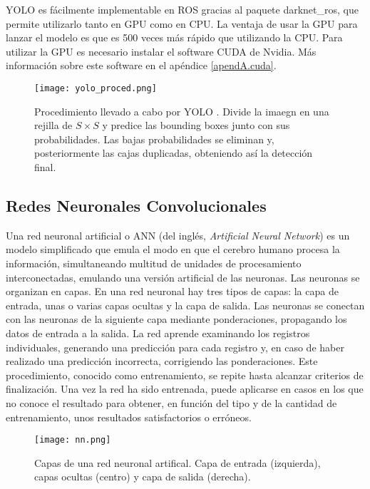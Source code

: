 YOLO es fácilmente implementable en ROS gracias al paquete darknet\_ros, que permite utilizarlo tanto en GPU como en CPU. La ventaja de usar la GPU para lanzar el modelo es que es 500 veces más rápido que utilizando la CPU. Para utilizar la GPU es necesario instalar el software CUDA de Nvidia. Más información sobre este software en el apéndice \ref{apendA.cuda}.\\

\begin{figure}[H]
	\begin{center} 
		\texttt{[image: yolo\_proced.png]}
	\end{center}
	\caption{Procedimiento llevado a cabo por YOLO \cite{yolo}. Divide la imaegn en una rejilla de $S \times S$ y predice las bounding boxes junto con sus probabilidades. Las bajas probabilidades se eliminan y, posteriormente las cajas duplicadas, obteniendo así la detección final.}
	\label{fig:proced}
\end{figure}


\subsection{Redes Neuronales Convolucionales}

Una red neuronal artificial o ANN (del inglés, \textit{Artificial Neural Network}) es un modelo simplificado que emula el modo en que el cerebro humano procesa la información, simultaneando multitud de unidades de procesamiento interconectadas, emulando una versión artificial de las neuronas. Las neuronas se organizan en capas. En una red neuronal hay tres tipos de capas: la capa de entrada, unas o varias capas ocultas y la capa de salida. Las neuronas se conectan con las neuronas de la siguiente capa mediante ponderaciones, propagando los datos de entrada a la salida. La red aprende examinando los registros individuales, generando una predicción para cada registro y, en caso de haber realizado una predicción incorrecta, corrigiendo las ponderaciones. Este procedimiento, conocido como entrenamiento, se repite hasta alcanzar criterios de finalización.  Una vez la red ha sido entrenada, puede aplicarse en casos en los que no conoce el resultado para obtener, en función del tipo y de la cantidad de entrenamiento, unos resultados satisfactorios o erróneos. \cite{nn}\\

\begin{figure}[h]
	\begin{center} 
		\texttt{[image: nn.png]}
	\end{center}
	\caption{Capas de una red neuronal artifical. Capa de entrada (izquierda), capas ocultas (centro) y capa de salida (derecha). \cite{foto_nn}}
	\label{fig:nn}
\end{figure}

